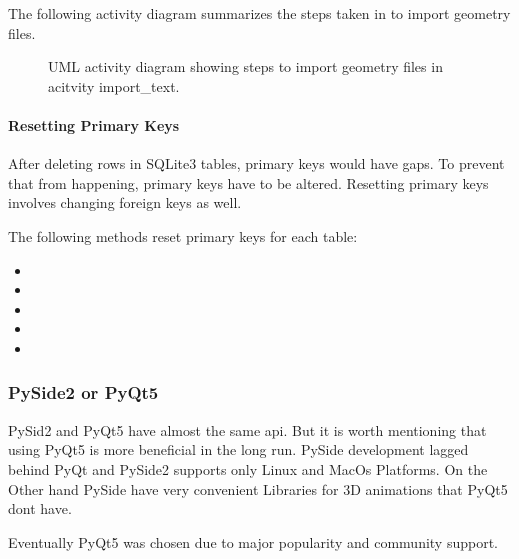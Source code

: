 \documentclass[letterpaper,10pt,english]{sphinxmanual}
\begin{document}
The following activity diagram summarizes the steps taken in  to import geometry files.

\begin{figure}[htbp]
\centering
\capstart

\noindent{}
\caption{UML activity diagram showing steps to import geometry files in acitvity import\_text.}\label{\detokenize{implementation:id2}}\end{figure}


\paragraph{Resetting Primary Keys}
\label{\detokenize{implementation:resetting-primary-keys}}
After deleting rows in SQLite3 tables, primary keys would have gaps. To prevent that from happening, primary keys have to be altered.
Resetting primary keys involves changing foreign keys as well.

The following methods reset primary keys for each table:
\begin{itemize}
\item {} 

\item {} 

\item {} 

\item {} 

\item {} 

\end{itemize}


\subsubsection{PySide2 or PyQt5}
\label{\detokenize{implementation:pyside2-or-pyqt5}}
PySid2 and PyQt5 have almost the same api.
But it is worth mentioning that using PyQt5 is more beneficial in the long run.
PySide development lagged behind PyQt and PySide2 supports only Linux and MacOs Platforms.
On the Other hand PySide have very convenient Libraries for 3D animations that PyQt5 dont have.

Eventually PyQt5 was chosen due to major popularity and community support.
\end{document}
